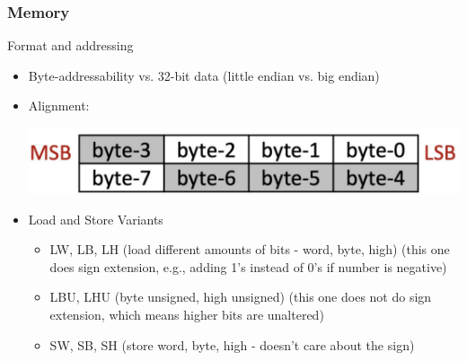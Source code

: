 \documentclass[10pt]{article}
\begin{document}
\subsubsection*{Memory}
Format and addressing
\begin{itemize}
    \item Byte-addressability vs. 32-bit data (little endian vs. big endian)
    \item Alignment:
    \begin{center}
        \includegraphics*[scale=0.4]{W1_3.png}
    \end{center}
    \item Load and Store Variants
    \begin{itemize}
        \item LW, LB, LH (load different amounts of bits - word, byte, high) (this one does sign extension, e.g., adding 1's instead of 0's if number is negative)
        \item LBU, LHU (byte unsigned, high unsigned) (this one does not do sign extension, which means higher bits are unaltered)
        \item SW, SB, SH (store word, byte, high - doesn't care about the sign)
    \end{itemize}
\end{itemize}
\end{document}
